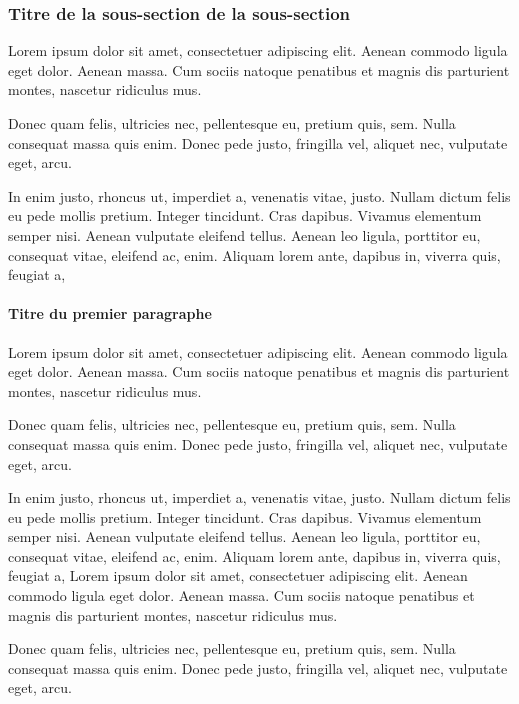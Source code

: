 \documentclass[a4paper,12pt]{report}
\begin{document}
\subsubsection {Titre de la sous-section de la sous-section}

Lorem ipsum dolor sit amet, consectetuer adipiscing elit. Aenean
commodo ligula eget dolor. Aenean massa. Cum sociis natoque
penatibus et magnis dis parturient montes, nascetur ridiculus mus.

Donec quam felis, ultricies nec, pellentesque eu, pretium quis, sem.
Nulla consequat massa quis enim. Donec pede justo, fringilla vel,
aliquet nec, vulputate eget, arcu.

In enim justo, rhoncus ut, imperdiet a, venenatis vitae, justo.
Nullam dictum felis eu pede mollis pretium. Integer tincidunt. Cras
dapibus. Vivamus elementum semper nisi. Aenean vulputate eleifend
tellus. Aenean leo ligula, porttitor eu, consequat vitae, eleifend
ac, enim. Aliquam lorem ante, dapibus in, viverra quis, feugiat a,

\paragraph {Titre du premier paragraphe} \par

Lorem ipsum dolor sit amet, consectetuer adipiscing elit. Aenean
commodo ligula eget dolor. Aenean massa. Cum sociis natoque
penatibus et magnis dis parturient montes, nascetur ridiculus mus.

Donec quam felis, ultricies nec, pellentesque eu, pretium quis, sem.
Nulla consequat massa quis enim. Donec pede justo, fringilla vel,
aliquet nec, vulputate eget, arcu.

In enim justo, rhoncus ut, imperdiet a, venenatis vitae, justo.
Nullam dictum felis eu pede mollis pretium. Integer tincidunt. Cras
dapibus. Vivamus elementum semper nisi. Aenean vulputate eleifend
tellus. Aenean leo ligula, porttitor eu, consequat vitae, eleifend
ac, enim. Aliquam lorem ante, dapibus in, viverra quis, feugiat a,
Lorem ipsum dolor sit amet, consectetuer adipiscing elit. Aenean
commodo ligula eget dolor. Aenean massa. Cum sociis natoque
penatibus et magnis dis parturient montes, nascetur ridiculus mus.

Donec quam felis,\cite{lecun2015deep} ultricies nec, pellentesque eu, pretium
quis, sem. Nulla consequat massa quis enim. Donec pede justo,
fringilla vel, aliquet nec, vulputate eget, arcu.
\end{document}

